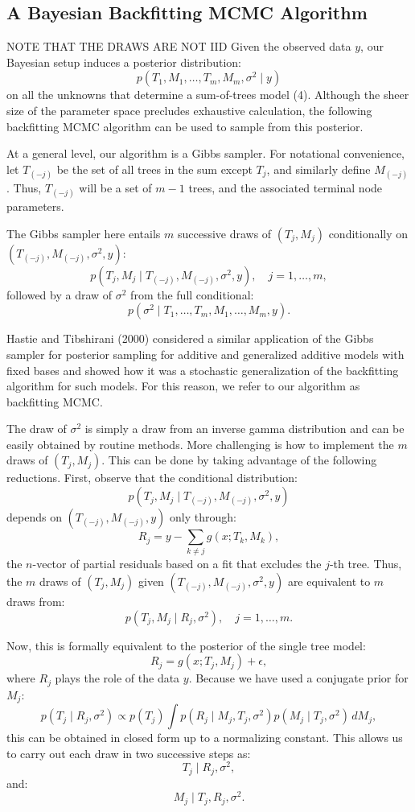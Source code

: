 \documentclass[a4paper,11pt]{article}
\begin{document}
\subsection{ A Bayesian Backfitting MCMC Algorithm}
NOTE THAT THE DRAWS ARE NOT IID
Given the observed data \( y \), our Bayesian setup induces a posterior distribution:
\[
p\left(T_1, M_1, \ldots, T_m, M_m, \sigma^2 \mid y\right)
\]
on all the unknowns that determine a sum-of-trees model (4). Although the sheer size of the parameter space precludes exhaustive calculation, the following backfitting MCMC algorithm can be used to sample from this posterior. 

At a general level, our algorithm is a Gibbs sampler. For notational convenience, let \( T_{(-j)} \) be the set of all trees in the sum except \( T_j \), and similarly define \( M_{(-j)} \). Thus, \( T_{(-j)} \) will be a set of \( m - 1 \) trees, and the associated terminal node parameters. 

The Gibbs sampler here entails \( m \) successive draws of \( (T_j, M_j) \) conditionally on \( (T_{(-j)}, M_{(-j)}, \sigma^2, y) \):
\[
p(T_j, M_j \mid T_{(-j)}, M_{(-j)}, \sigma^2, y), \quad j = 1, \ldots, m,
\]
followed by a draw of \( \sigma^2 \) from the full conditional:
\[
p\left(\sigma^2 \mid T_1, \ldots, T_m, M_1, \ldots, M_m, y\right).
\]

Hastie and Tibshirani (2000) considered a similar application of the Gibbs sampler for posterior sampling for additive and generalized additive models with fixed bases and showed how it was a stochastic generalization of the backfitting algorithm for such models. For this reason, we refer to our algorithm as backfitting MCMC.

The draw of \( \sigma^2 \) is simply a draw from an inverse gamma distribution and can be easily obtained by routine methods. More challenging is how to implement the \( m \) draws of \( (T_j, M_j) \). This can be done by taking advantage of the following reductions. First, observe that the conditional distribution:
\[
p\left(T_j, M_j \mid T_{(-j)}, M_{(-j)}, \sigma^2, y\right)
\]
depends on \( (T_{(-j)}, M_{(-j)}, y) \) only through:
\[
R_j = y - \sum_{k \neq j} g(x; T_k, M_k),
\]
the \( n \)-vector of partial residuals based on a fit that excludes the \( j \)-th tree. Thus, the \( m \) draws of \( (T_j, M_j) \) given \( (T_{(-j)}, M_{(-j)}, \sigma^2, y) \) are equivalent to \( m \) draws from:
\[
p(T_j, M_j \mid R_j, \sigma^2), \quad j = 1, \ldots, m.
\]

Now, this is formally equivalent to the posterior of the single tree model:
\[
R_j = g(x; T_j, M_j) + \epsilon,
\]
where \( R_j \) plays the role of the data \( y \). Because we have used a conjugate prior for \( M_j \):
\[
p(T_j \mid R_j, \sigma^2) \propto p(T_j) \int p(R_j \mid M_j, T_j, \sigma^2) p(M_j \mid T_j, \sigma^2) \, dM_j,
\]
this can be obtained in closed form up to a normalizing constant. This allows us to carry out each draw in two successive steps as:
\[
T_j \mid R_j, \sigma^2,
\]
and:
\[
M_j \mid T_j, R_j, \sigma^2.
\]
\end{document}
